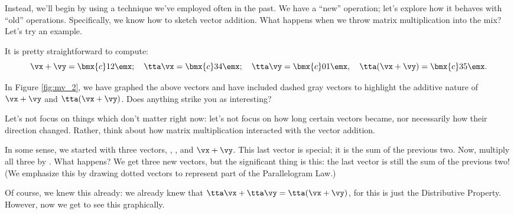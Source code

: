 Instead, we'll begin by using a technique we've employed often in the past. We have a ``new'' operation; let's explore how it behaves with ``old'' operations. Specifically, we know how to sketch vector addition. What happens when we throw matrix multiplication into the mix? Let's try an example.

\medskip

{It is pretty straightforward to compute: 
\[
\vx+\vy = \bmx{c} 1\\2\emx;\quad \tta\vx = \bmx{c}3\\4\emx; \quad \tta\vy = \bmx{c} 0\\1\emx,\quad \tta(\vx+\vy) = \bmx{c} 3\\5\emx.
\]

In Figure \ref{fig:mv_2}, we have graphed the above vectors and have included dashed gray vectors to highlight the additive nature of $\vx+\vy$ and $\tta(\vx+\vy)$. Does anything strike you as interesting?

\begin{myfigure}%
\begin{center}
\end{center}
\label{fig:mv_2}
\end{myfigure}%

Let's not focus on things which don't matter right now: let's not focus on how long certain vectors became, nor necessarily how their direction changed. Rather, think about how matrix multiplication interacted with the vector addition.

In some sense, we started with three vectors, \vx, \vy, and $\vx+\vy$. This last vector is special; it is the sum of the previous two. Now, multiply all three by \tta. What happens? We get three new vectors, but the significant thing is this: the last vector is still the sum of the previous two! (We emphasize this by drawing dotted vectors to represent part of the Parallelogram Law.)

Of course, we knew this already: we already knew that $\tta\vx + \tta\vy = \tta(\vx+\vy)$, for this is just the Distributive Property. However, now we get to see this graphically.}

